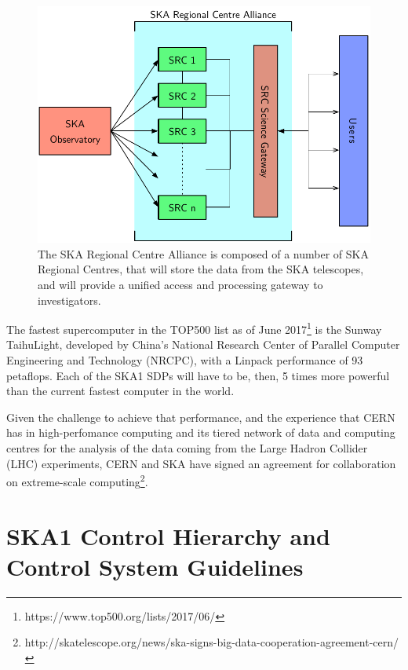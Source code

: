 \documentclass[a4paper,
               biblatex,       %
               keeplastbox,    %
               ]{jacow-2_1}    %
\begin{document}
\begin{figure}[!tb]
  \centering
    \includegraphics[width=\columnwidth]{figs/SRCs.pdf}
  \caption{The SKA Regional Centre Alliance is composed of a number of SKA Regional Centres, that will store the data from the SKA telescopes, and will provide a unified access and processing gateway to investigators.}
  \label{fig:figs_SRCs}
\end{figure}

The fastest supercomputer in the TOP500 list as of June 2017\footnote{https://www.top500.org/lists/2017/06/} is the Sunway TaihuLight, developed by China’s National Research Center of Parallel Computer Engineering and Technology (NRCPC), with a Linpack performance of 93 petaflops. Each of the SKA1 SDPs will have to be, then, 5 times more powerful than the current fastest computer in the world.

Given the challenge to achieve that performance, and the experience that CERN has in high-perfomance computing and its tiered network of data and computing centres for the analysis of the data coming from the Large Hadron Collider (LHC) experiments, CERN and SKA have signed an agreement for collaboration on extreme-scale computing\footnote{http://skatelescope.org/news/ska-signs-big-data-cooperation-agreement-cern/}.


\section{SKA1 Control Hierarchy and Control System Guidelines} %
\label{sec:ska1_control_hierarchy_and_control_system_guidelines}
\end{document}
